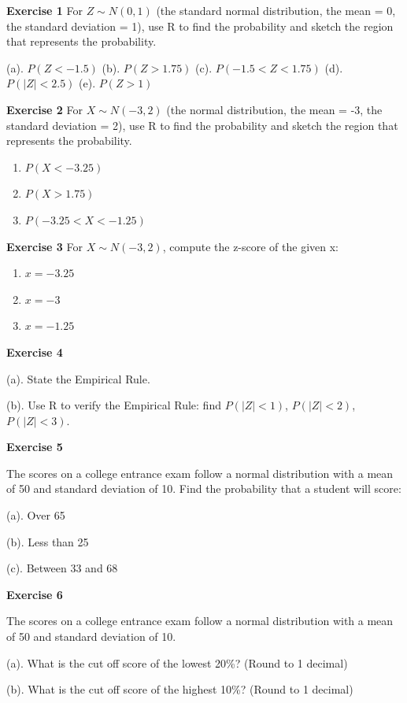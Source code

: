 \documentclass[
]{book}
\providecommand{\tightlist}{%
  \setlength{\itemsep}{0pt}\setlength{\parskip}{0pt}}
\begin{document}
\textbf{Exercise 1} For \(Z \sim N(0, 1)\) (the standard normal distribution, the mean = 0, the standard deviation = 1), use R to find the probability and sketch the region that represents the probability.

(a). \(P(Z < -1.5)\) (b). \(P(Z > 1.75)\) (c). \(P(-1.5 < Z < 1.75)\) (d). \(P(|Z| < 2.5)\) (e). \(P(Z > 1)\)

\textbf{Exercise 2} For \(X \sim N(-3, 2)\) (the normal distribution, the mean = -3, the standard deviation = 2), use R to find the probability and sketch the region that represents the probability.

\begin{enumerate}
\def\labelenumi{\arabic{enumi}.}
\tightlist
\item
  \(P(X < -3.25)\)
\item
  \(P(X > 1.75)\)
\item
  \(P(-3.25 < X < -1.25)\)
\end{enumerate}

\textbf{Exercise 3} For \(X \sim N(-3, 2)\), compute the z-score of the given x:

\begin{enumerate}
\def\labelenumi{\arabic{enumi}.}
\tightlist
\item
  \(x = -3.25\)
\item
  \(x = -3\)
\item
  \(x = -1.25\)
\end{enumerate}

\textbf{Exercise 4}

(a). State the Empirical Rule.

(b). Use R to verify the Empirical Rule: find \(P(|Z| < 1)\), \(P(|Z| < 2)\), \(P(|Z| < 3)\).

\textbf{Exercise 5}

The scores on a college entrance exam follow a normal distribution with a mean of 50 and standard deviation of 10. Find the probability that a student will score:

(a). Over 65

(b). Less than 25

(c). Between 33 and 68

\textbf{Exercise 6}

The scores on a college entrance exam follow a normal distribution with a mean of 50 and standard deviation of 10.

(a). What is the cut off score of the lowest 20\%? (Round to 1 decimal)

(b). What is the cut off score of the highest 10\%? (Round to 1 decimal)
\end{document}
